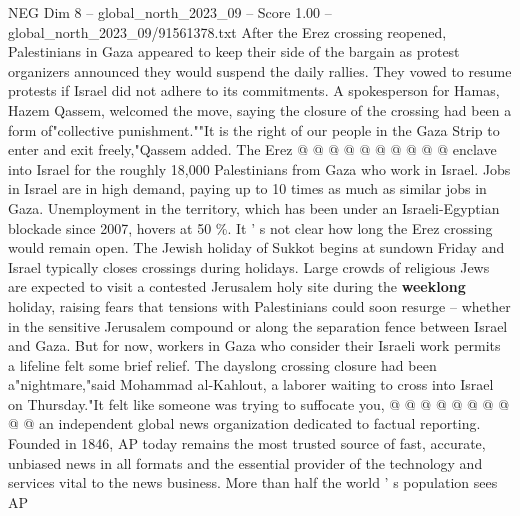\begin{textsample}{NEG Dim 8 – global\_north\_2023\_09 – Score 1.00 – global\_north\_2023\_09/91561378.txt}
After the Erez crossing reopened, Palestinians in Gaza appeared to keep their side of the bargain as protest organizers announced they would suspend the daily rallies.
They vowed to resume protests if Israel did not adhere to its commitments.
A spokesperson for Hamas, Hazem Qassem, welcomed the move, saying the closure of the crossing had been a form of"collective punishment.""It is the right of our people in the Gaza Strip to enter and exit freely,"Qassem added.
The Erez @ @ @ @ @ @ @ @ @ @ enclave into Israel for the roughly 18,000 Palestinians from Gaza who work in Israel.
Jobs in Israel are in high demand, paying up to 10 times as much as similar jobs in Gaza.
Unemployment in the territory, which has been under an Israeli-Egyptian blockade since 2007, hovers at 50 \%.
It ' s not clear how long the Erez crossing would remain open.
The Jewish holiday of Sukkot begins at sundown Friday and Israel typically closes crossings during holidays.
Large crowds of religious Jews are expected to visit a contested Jerusalem holy site during the \textbf{weeklong} holiday, raising fears that tensions with Palestinians could soon resurge -- whether in the sensitive Jerusalem compound or along the separation fence between Israel and Gaza.
But for now, workers in Gaza who consider their Israeli work permits a lifeline felt some brief relief.
The dayslong crossing closure had been a"nightmare,"said Mohammad al-Kahlout, a laborer waiting to cross into Israel on Thursday."It felt like someone was trying to suffocate you, @ @ @ @ @ @ @ @ @ @ an independent global news organization dedicated to factual reporting.
Founded in 1846, AP today remains the most trusted source of fast, accurate, unbiased news in all formats and the essential provider of the technology and services vital to the news business.
More than half the world ' s population sees AP

\end{textsample}

